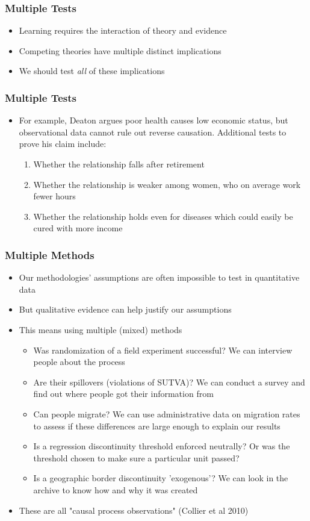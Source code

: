 \documentclass[xcolor=x11names,compress]{beamer}\usepackage[]{graphicx}\usepackage[]{color}
\renewcommand{\(}{\begin{columns}}
\renewcommand{\)}{\end{columns}}
\newcommand{\<}[1]{\begin{column}{#1}}
\renewcommand{\>}{\end{column}}
\begin{document}
\begin{frame}
\frametitle{Multiple Tests}
\begin{itemize}
\item Learning requires the interaction of theory and evidence
\item Competing theories have multiple distinct implications
\item We should test \textit{all} of these implications
\end{itemize}
\end{frame}

\begin{frame}
\frametitle{Multiple Tests}
\begin{itemize}
\item For example, Deaton argues poor health causes low economic status, but observational data cannot rule out reverse causation. Additional tests to prove his claim include:
\begin{enumerate}
\item Whether the relationship falls after retirement
\item Whether the relationship is weaker among women, who on average work fewer hours
\item Whether the relationship holds even for diseases which could easily be cured with more income
\end{enumerate}
\end{itemize}
\end{frame}

\begin{frame}
\frametitle{Multiple Methods}
\begin{itemize}
\item Our methodologies' assumptions are often impossible to test in quantitative data
\item But qualitative evidence can help justify our assumptions
\item This means using multiple (mixed) methods
\begin{itemize}
\item Was randomization of a field experiment successful? We can interview people about the process
\item Are their spillovers (violations of SUTVA)? We can conduct a survey and find out where people got their information from
\item Can people migrate? We can use administrative data on migration rates to assess if these differences are large enough to explain our results
\item Is a regression discontinuity threshold enforced neutrally? Or was the threshold chosen to make sure a particular unit passed?
\item Is a geographic border discontinuity 'exogenous'? We can look in the archive to know how and why it was created
\end{itemize}
\item These are all "causal process observations" (Collier et al 2010)
\end{itemize}
\end{frame}
\end{document}
